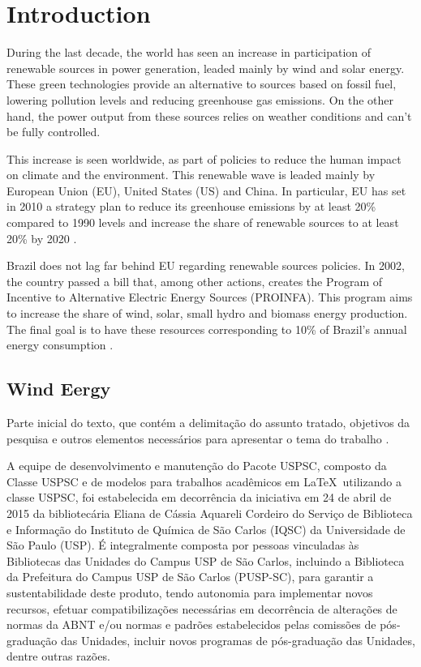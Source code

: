 
\chapter[Introduction]{Introduction}

During the last decade, the world has seen an increase in participation of renewable sources in power generation, leaded mainly by wind and solar energy. These green technologies provide an alternative to sources based on fossil fuel, lowering pollution levels and reducing greenhouse gas emissions. On the other hand, the power output from these sources relies on weather conditions and can't be fully controlled.

This increase is seen worldwide, as part of policies to reduce the human impact on climate and the environment. This renewable wave is leaded mainly by European Union (EU), United States (US) and China. In particular, EU has set in 2010 a strategy plan to reduce its greenhouse emissions by at least 20\% compared to 1990 levels and increase the share of renewable sources to at least 20\% by 2020 \cite{Europe2020}.

Brazil does not lag far behind EU regarding renewable sources policies. In 2002, the country passed a bill that, among other actions, creates the Program of Incentive to Alternative Electric Energy Sources (PROINFA). This program aims to increase the share of wind, solar, small hydro and biomass energy production. The final goal is to have these resources corresponding to 10\% of Brazil's annual energy consumption \cite{PROINFA2002}.

\section{Wind Eergy}


Parte inicial do texto, que contém a delimitação do assunto tratado, objetivos da pesquisa e outros elementos necessários para apresentar o tema do trabalho \cite{sibi2016}.

A equipe de desenvolvimento e manutenção do Pacote USPSC, composto da Classe USPSC e de modelos para trabalhos acadêmicos em \LaTeX\ utilizando a classe USPSC, foi estabelecida em decorrência da iniciativa em 24 de abril de 2015 da bibliotecária Eliana de Cássia Aquareli Cordeiro do Serviço de Biblioteca e Informação do Instituto de Química de São Carlos (IQSC) da Universidade de São Paulo (USP). É integralmente composta por pessoas vinculadas às Bibliotecas das Unidades do Campus USP de São Carlos, incluindo a Biblioteca da Prefeitura do Campus USP de São Carlos (PUSP-SC), para garantir a sustentabilidade deste produto, tendo autonomia para implementar novos recursos, efetuar compatibilizações necessárias em decorrência de alterações de normas da ABNT e/ou normas e padrões estabelecidos pelas comissões de pós-graduação das Unidades, incluir novos programas de pós-graduação das Unidades, dentre outras razões. 

